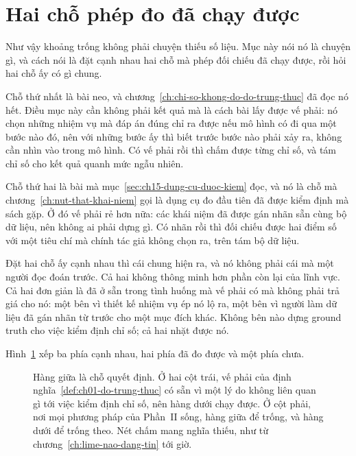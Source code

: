 \section{Hai chỗ phép đo đã chạy được}
\label{sec:ch18-hai-cho-da-do-duoc}

%
Như vậy khoảng trống không phải chuyện thiếu số liệu. Mục này nói nó là chuyện
gì, và cách nói là đặt cạnh nhau hai chỗ mà phép đối chiếu đã chạy được, rồi hỏi
hai chỗ ấy có gì chung.

%
Chỗ thứ nhất là bài neo, và
chương~\ref{ch:chi-so-khong-do-do-trung-thuc} đã đọc nó hết. Điều mục này cần
không phải kết quả mà là cách bài lấy được vế phải: nó chọn những nhiệm vụ mà đáp
án đúng chỉ ra được nếu mô hình có đi qua một bước nào đó, nên với những bước ấy
thì biết trước bước nào phải xảy ra, không cần nhìn vào trong mô hình. Có vế phải
rồi thì chấm được từng chỉ số, và tám chỉ số cho kết quả quanh mức ngẫu nhiên.

%
Chỗ thứ hai là bài mà mục~\ref{sec:ch15-dung-cu-duoc-kiem} đọc, và nó là chỗ mà
chương~\ref{ch:nut-that-khai-niem} gọi là dụng cụ đo đầu tiên đã được kiểm định
mà sách gặp. Ở đó vế phải rẻ hơn nữa: các khái niệm đã được gán nhãn sẵn cùng bộ
dữ liệu, nên không ai phải dựng gì. Có nhãn rồi thì đối chiếu được hai điểm số
 với một tiêu chí mà chính tác giả không chọn ra, trên tám bộ
dữ liệu.

%
Đặt hai chỗ ấy cạnh nhau thì cái chung hiện ra, và nó không phải cái mà một người
đọc đoán trước. Cả hai không thông minh hơn phần còn lại của lĩnh vực. Cả hai
đơn giản là đã ở sẵn trong tình huống mà vế phải có mà không phải trả giá cho nó:
một bên vì thiết kế nhiệm vụ ép nó lộ ra, một bên vì người làm dữ liệu đã gán nhãn
từ trước cho một mục đích khác. Không bên nào dựng ground truth cho việc kiểm
định chỉ số; cả hai nhặt được nó.

Hình~\ref{fig:ch18-hinh-dang-khoang-trong} xếp ba phía cạnh nhau, hai phía đã đo
được và một phía chưa.

\begin{figure}[htbp]
  \centering
  
  \caption{Hàng giữa là chỗ quyết định. Ở hai cột trái, vế phải của
  định nghĩa~\ref{def:ch01-do-trung-thuc} có sẵn vì một lý do không liên quan gì
  tới việc kiểm định chỉ số, nên hàng dưới chạy được. Ở cột phải, nơi mọi phương
  pháp của Phần~II sống, hàng giữa để trống, và hàng dưới để trống theo. Nét chấm
  mang nghĩa thiếu, như từ chương~\ref{ch:lime-nao-dang-tin} tới giờ.}
  \label{fig:ch18-hinh-dang-khoang-trong}
\end{figure}

